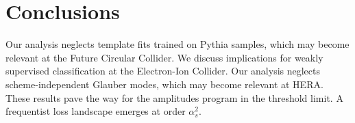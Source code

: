 \section{Conclusions}\label{sec:conclusions}

Our analysis neglects template fits trained on Pythia samples, which may
become relevant at the Future Circular Collider. We discuss implications
for weakly supervised classification at the Electron-Ion Collider. Our
analysis neglects scheme-independent Glauber modes, which may become
relevant at HERA. These results pave the way for the amplitudes program
in the threshold limit. A frequentist loss landscape emerges at order
$\alpha_s^2$.

